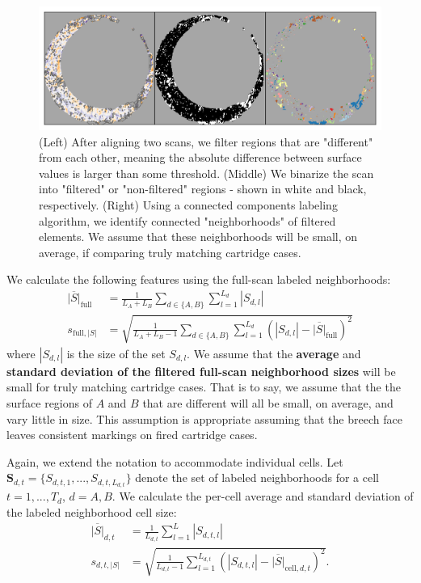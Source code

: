 \documentclass[
]{jdssv}
\begin{document}
\begin{CodeChunk}
\begin{figure}[htbp]

{\centering \includegraphics[width=\textwidth]{figures/filterLabeling} 

}

\caption{\label{fig:filterLabeling} (Left) After aligning two scans, we filter regions that are "different" from each other, meaning the absolute difference between surface values is larger than some threshold. (Middle) We binarize the scan into "filtered" or "non-filtered" regions - shown in white and black, respectively. (Right) Using a connected components labeling algorithm, we identify connected "neighborhoods" of filtered elements. We assume that these neighborhoods will be small, on average, if comparing truly matching cartridge cases.}\label{fig:unnamed-chunk-22}
\end{figure}
\end{CodeChunk}

We calculate the following features using the full-scan labeled
neighborhoods: \begin{align*}
\overline{|S|}_{\text{full}} &= \frac{1}{L_A + L_B} \sum_{d \in \{A,B\}} \sum_{l=1}^{L_d} |S_{d,l}| \\
s_{\text{full},|S|} &= \sqrt{\frac{1}{L_A + L_B - 1} \sum_{d \in \{A,B\}} \sum_{l=1}^{L_d} (|S_{d,l}| - \overline{|S|}_{\text{full}})^2}
\end{align*} where \(|S_{d,l}|\) is the size of the set \(S_{d,l}\). We
assume that the \textbf{average} and
\textbf{standard deviation of the filtered full-scan neighborhood sizes}
will be small for truly matching cartridge cases. That is to say, we
assume that the the surface regions of \(A\) and \(B\) that are
different will all be small, on average, and vary little in size. This
assumption is appropriate assuming that the breech face leaves
consistent markings on fired cartridge cases.

Again, we extend the notation to accommodate individual cells. Let
\(\pmb{S}_{d,t} = \{S_{d,t,1},...,S_{d,t,L_{d,t}}\}\) denote the set of
labeled neighborhoods for a cell \(t = 1,...,T_d\), \(d = A,B\). We
calculate the per-cell average and standard deviation of the labeled
neighborhood cell size: \begin{align*}
\overline{|S|}_{d,t} &= \frac{1}{L_{d,t}} \sum_{l=1}^L |S_{d,t,l}| \\
s_{d,t,|S|} &= \sqrt{\frac{1}{L_{d,t} - 1} \sum_{l=1}^{L_{d,t}} (|S_{d,t,l}| - \overline{|S|}_{\text{cell},d,t})^2}.
\end{align*}
\end{document}
